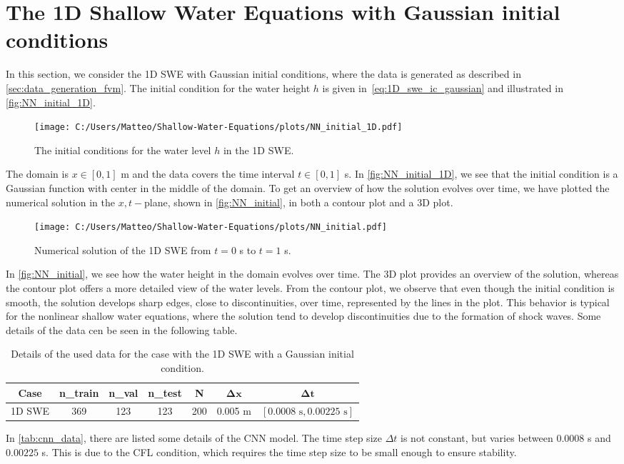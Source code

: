 \section{The 1D Shallow Water Equations with Gaussian initial conditions}
In this section, we consider the 1D SWE with Gaussian initial conditions, where the data is generated as described in \autoref{sec:data_generation_fvm}.
The initial condition for the water height $h$ is given in~\eqref{eq:1D_swe_ic_gaussian} and illustrated in \autoref{fig:NN_initial_1D}.
\begin{figure}[H]
    \centering
    \texttt{[image: C:/Users/Matteo/Shallow-Water-Equations/plots/NN\_initial\_1D.pdf]}
    \caption{The initial conditions for the water level $h$ in the 1D SWE.}\label{fig:NN_initial_1D}
\end{figure}
The domain is $ x \in [0, 1]$ m and the data covers the time interval $t \in [0, 1]$ s.
In \autoref{fig:NN_initial_1D}, we see that the initial condition is a Gaussian function with center in the middle of the domain.
To get an overview of how the solution evolves over time, we have plotted the numerical solution in the $x,t-$plane, shown in \autoref{fig:NN_initial}, in both a contour plot and a 3D plot.
\begin{figure}[H]
    \hspace{1.7cm} %
    \texttt{[image: C:/Users/Matteo/Shallow-Water-Equations/plots/NN\_initial.pdf]}
    \caption{Numerical solution of the 1D SWE from $t = 0$ s to $t = 1$ s.}\label{fig:NN_initial}
\end{figure}
In \autoref{fig:NN_initial}, we see how the water height in the domain evolves over time.
The 3D plot provides an overview of the solution, whereas the contour plot offers a more detailed view of the water levels.
From the contour plot, we observe that even though the initial condition is smooth, the solution develops sharp edges, close to discontinuities, over time, represented by the lines in the plot.
This behavior is typical for the nonlinear shallow water equations, where the solution tend to develop discontinuities due to the formation of shock waves.
Some details of the data cen be seen in the following table.
\begin{table}[H]
    \centering
    \begin{tabular}{c|cccccc}
        \textbf{Case} & \textbf{n\_train} & \textbf{n\_val} & \textbf{n\_test} & \textbf{N} & $\mathbf{\Delta x}$ & $\mathbf{\Delta t}$ \\
        \hline
        1D SWE & 369 & 123 & 123 & 200 & 0.005 m & $[0.0008 \text{ s}, 0.00225 \text{ s}]$ \\
    \end{tabular}
    \caption{Details of the used data for the case with the 1D SWE with a Gaussian initial condition.}\label{tab:cnn_data}
\end{table}
In \autoref{tab:cnn_data}, there are listed some details of the CNN model.
The time step size $\Delta t$ is not constant, but varies between $0.0008$ s and $0.00225$ s.
This is due to the CFL condition, which requires the time step size to be small enough to ensure stability.


